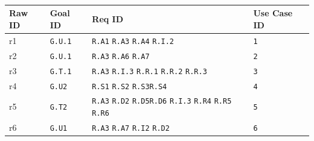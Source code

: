     \subsubsection{}

      \begin{table}[h!]
        \centering
        \begin{tabularx}{\linewidth}{|X|X|X|X|}
          \hline
          \textbf{Raw ID} & \textbf{Goal ID} & \textbf{Req ID} & \textbf{Use Case ID} \\
          \hline
	        r1 & \texttt{G.U.1} & \texttt{R.A1}  \newline \texttt{R.A3}  \newline \texttt{R.A4} \newline \texttt{R.I.2}& \texttt{1} \\
          \hline
	        r2 & \texttt{G.U.1} & \texttt{R.A3}  \newline \texttt{R.A6}  \newline \texttt{R.A7} & \texttt{2}  \\
	        \hline
	        r3 & \texttt{G.T.1} & \texttt{R.A3}  \newline \texttt{R.I.3}  \newline \texttt{R.R.1} \newline \texttt{R.R.2} \newline \texttt{R.R.3}& \texttt{3}  \\
          \hline
          r4 & \texttt{G.U2} & \texttt{R.S1} \newline  \texttt{R.S2} \newline \texttt{R.S3}\newline \texttt{R.S4} & \texttt{4}   \\
          \hline
          r5 & \texttt{G.T2} & \texttt{R.A3} \newline  \texttt{R.D2} \newline \texttt{R.D5}\newline \texttt{R.D6}  \newline \texttt{R.I.3} \newline \texttt{R.R4}  \newline \texttt{R.R5}  \newline \texttt{R.R6} & \texttt{5}   \\
          \hline
          r6 & \texttt{G.U1} & \texttt{R.A3} \newline \texttt{R.A7} \newline  \texttt{R.I2} \newline  \texttt{R.D2} & \texttt{6}   \\
          \hline
	      \end{tabularx}
      \end{table}

